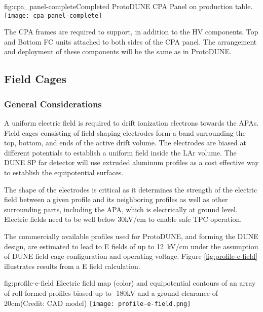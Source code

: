 \begin{dunefigure}{fig:cpa_panel-complete}{Completed ProtoDUNE CPA Panel on production table.}
\texttt{[image: cpa\_panel-complete]}
\end{dunefigure}

The CPA frames are required to support, in addition to the HV components, Top and Bottom FC units attached to both sides of the CPA panel. The arrangement and deployment of these components will be the same as in ProtoDUNE.  

\subsection{Field Cages}

\subsubsection{General Considerations}

A uniform electric field is required to drift ionization electrons towards the APAs. Field cages consisting of field shaping electrodes form a band surrounding the top, bottom, and ends of the active drift volume. The electrodes are biased at different potentials to establish a uniform field inside the LAr volume.
The DUNE SP far detector will use extruded aluminum profiles as a cost effective way to establish the equipotential surfaces. 

The shape of the electrodes is critical as it determines the strength of the electric field between a given profile and its neighboring profiles as well as
other surrounding parts, including the APA, which is electrically at ground level. Electric fields need to be well below 30kV/cm 
to enable safe TPC operation.

The commercially available profiles used for ProtoDUNE, and forming the DUNE design, are estimated to lead to E fields of up to 12~kV/cm under the assumption of DUNE field cage configuration 
and operating voltage. Figure \ref{fig:profile-e-field} illustrates results from a E field calculation.

\begin{dunefigure}
{fig:profile-e-field}
{Electric field map (color) and equipotential contours of an array of roll formed profiles biased up to -180kV and a ground clearance of 20cm(Credit: CAD model)} \texttt{[image: profile-e-field.png]}
\end{dunefigure}


